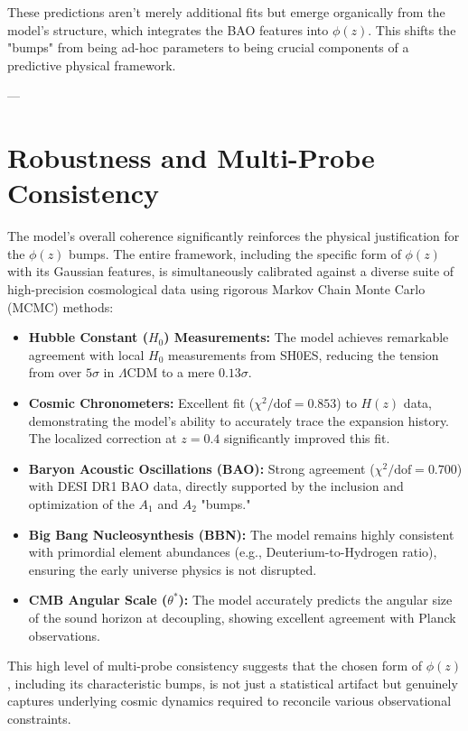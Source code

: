 \documentclass{article}
\begin{document}
These predictions aren't merely additional fits but emerge organically from the model's structure, which integrates the BAO features into $\phi(z)$. This shifts the "bumps" from being ad-hoc parameters to being crucial components of a predictive physical framework.

---

\section{Robustness and Multi-Probe Consistency}

The model's overall coherence significantly reinforces the physical justification for the $\phi(z)$ bumps. The entire framework, including the specific form of $\phi(z)$ with its Gaussian features, is simultaneously calibrated against a diverse suite of high-precision cosmological data using rigorous Markov Chain Monte Carlo (MCMC) methods:

\begin{itemize}
    \item \textbf{Hubble Constant ($H_0$) Measurements:} The model achieves remarkable agreement with local $H_0$ measurements from SH0ES, reducing the tension from over $5\sigma$ in $\Lambda$CDM to a mere $0.13\sigma$.
    \item \textbf{Cosmic Chronometers:} Excellent fit ($\chi^2/\text{dof} = 0.853$) to $H(z)$ data, demonstrating the model's ability to accurately trace the expansion history. The localized correction at $z=0.4$ significantly improved this fit.
    \item \textbf{Baryon Acoustic Oscillations (BAO):} Strong agreement ($\chi^2/\text{dof} = 0.700$) with DESI DR1 BAO data, directly supported by the inclusion and optimization of the $A_1$ and $A_2$ "bumps."
    \item \textbf{Big Bang Nucleosynthesis (BBN):} The model remains highly consistent with primordial element abundances (e.g., Deuterium-to-Hydrogen ratio), ensuring the early universe physics is not disrupted.
    \item \textbf{CMB Angular Scale ($\theta^*$):} The model accurately predicts the angular size of the sound horizon at decoupling, showing excellent agreement with Planck observations.
\end{itemize}

This high level of multi-probe consistency suggests that the chosen form of $\phi(z)$, including its characteristic bumps, is not just a statistical artifact but genuinely captures underlying cosmic dynamics required to reconcile various observational constraints.
\end{document}
